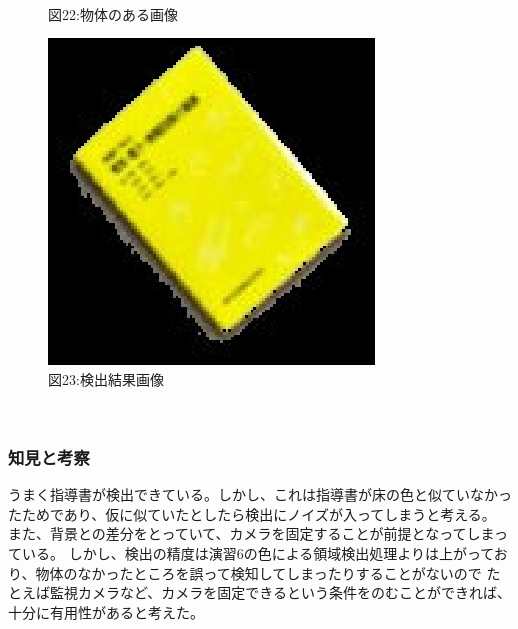 ﻿\documentclass[a4j,11pt]{jarticle}
\begin{document}
\begin{figure}[tb]
\begin{minipage}{0.49\hsize}
   \\図22:物体のある画像
 \end{minipage}
 \begin{minipage}{0.49\hsize} %
   \center
   \includegraphics[width=0.7\hsize]{./eps/back-electric.eps}
   \\図23:検出結果画像
 \end{minipage}
 \
 \label{fig:affine2}
\end{figure}
\subsubsection{知見と考察}
うまく指導書が検出できている。しかし、これは指導書が床の色と似ていなかったためであり、仮に似ていたとしたら検出にノイズが入ってしまうと考える。
また、背景との差分をとっていて、カメラを固定することが前提となってしまっている。
しかし、検出の精度は演習6の色による領域検出処理よりは上がっており、物体のなかったところを誤って検知してしまったりすることがないので
たとえば監視カメラなど、カメラを固定できるという条件をのむことができれば、十分に有用性があると考えた。
\end{document}
